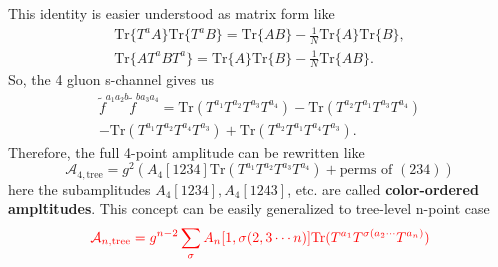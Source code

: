 \documentclass{beamer}
\begin{document}
\begin{frame}
    This identity is easier understood as matrix form like 
    \begin{align*}
    \mathrm{Tr}\{T^aA\}\mathrm{Tr}\{T^aB\}=\mathrm{Tr}\{AB\}-\frac{1}{N}\mathrm{Tr}\{A\}\mathrm{Tr}\{B\},\\
    \mathrm{Tr}\{AT^aBT^a\}=\mathrm{Tr}\{A\}\mathrm{Tr}\{B\}-\frac{1}{N}\mathrm{Tr}\{AB\}.
    \end{align*}
    So, the 4 gluon s-channel gives us
    \begin{align*}
        \tilde{f}^{a_1a_2b}\tilde{f}^{ba_3a_4}=\mathrm{Tr}(T^{a_1}T^{a_2}T^{a_3}T^{a_4})-\mathrm{Tr}(T^{a_2}T^{a_1}T^{a_3}T^{a_4})\\
        -\mathrm{Tr}(T^{a_1}T^{a_2}T^{a_4}T^{a_3})+\mathrm{Tr}(T^{a_2}T^{a_1}T^{a_4}T^{a_3}).
    \end{align*}
    Therefore, the full 4-point amplitude can be rewritten like
    \begin{equation*}
        \mathcal{A}_{4,\text{tree}}=g^2(A_4[1234]\mathrm{Tr}(T^{a_1}T^{a_2}T^{a_3}T^{a_4})+\text{perms of } (234) )
    \end{equation*}
    here the subamplitudes $A_4[1234],A_4[1243]$, etc. are called \textbf{color-ordered ampltitudes}. This concept can be easily generalized to tree-level n-point case
    \begin{equation*}
        \textcolor{red}{\mathcal{A}_{n,\text{tree}}=g^{n-2}\sum_{\sigma}A_n[1,\sigma(2,3\cdots n)]\mathrm{Tr}(T^{a_1}T^{\sigma(a_2\cdots}T^{a_n)})}
    \end{equation*}
\end{frame}
\end{document}
